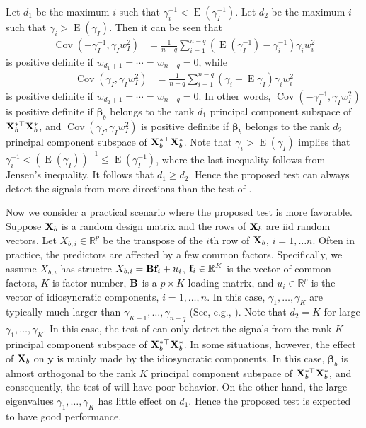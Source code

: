 \documentclass[11pt]{article}
\DeclareMathOperator{\myE}{E}
\DeclareMathOperator{\myCov}{Cov}
\newcommand{\By}{\mathbf{y}}    \newcommand{\Bz}{\mathbf{z}}
\newcommand{\bfsym}[1]{\ensuremath{\boldsymbol{#1}}}
\def\bbeta{\bfsym \beta}
\theoremstyle{plain}
\theoremstyle{definition}
\theoremstyle{remark}
\begin{document}
Let $d_1$ be the maximum $i$ such that $ \gamma_i^{-1} < \myE (\gamma_I^{-1})$.
Let $d_2$ be the maximum $i$ such that $\gamma_i > \myE (\gamma_I) $.
Then it can be seen that
\begin{align*}
\myCov (-\gamma_I^{-1}, \gamma_I w_I^2)
&=
\frac{1}{n-q} \sum_{i=1}^{n-q} \left(\myE (\gamma_I^{-1})-\gamma_i^{-1} \right) \gamma_i w_i^2
\end{align*}
is positive definite if $w_{d_1+1}=\cdots =w_{n-q}=0$, while
\begin{align*}
    \myCov(\gamma_I, \gamma_I w_I^2)
&=
\frac{1}{n-q} \sum_{i=1}^{n-q} \left(\gamma_i - \myE \gamma_I \right) \gamma_i w_i^2
\end{align*}
is positive definite if $w_{d_2 + 1}=\cdots = w_{n-q}=0$.
In other words, $\myCov(-\gamma_I^{-1}, \gamma_I w_I^2)$ is positive definite if $\bbeta_b$ belongs to the rank $d_1$ principal component subspace of $\mathbf{X}_{b}^{*\top}\mathbf{X}_b^{*}$, and $\myCov(\gamma_I, \gamma_I w_I^2)$ is positive definite if $\bbeta_b$ belongs to the rank $d_2$ principal component subspace of $\mathbf{X}_{b}^{*\top}\mathbf{X}_b^{*}$.
Note that $\gamma_i > \myE (\gamma_I)$ implies that $\gamma_i^{-1} < (\myE (\gamma_I))^{-1}\leq \myE (\gamma_I^{-1})$, where the last inequality follows from Jensen's inequality.
It follows that $ d_1 \geq d_2 $.
Hence the proposed test can always detect the signals from more directions than the test of \cite{Goeman2006}.

Now we consider a practical scenario where the proposed test is more favorable.
Suppose $\mathbf{X}_b$ is a random design matrix and the rows of $\mathbf{X}_b$ are iid random vectors.
Let $X_{b,i}\in \mathbb R^p$ be the transpose of the $i$th row of $\mathbf{X}_b$, $i=1,\ldots n$.
Often in practice, the predictors are affected by a few common factors.
Specifically, we assume $X_{b,i}$ has structre $X_{b,i}= \mathbf{B} \mathbf{f}_i + u_i$, $\mathbf{f}_i \in \mathbb R^K$ is the vector of common factors, $K$ is factor number, $\mathbf{B}$ is a $p\times K$ loading matrix, and $u_i\in \mathbb R^p$ is the vector of idiosyncratic components, $i=1,\ldots,n $.
In this case, $\gamma_1,\ldots, \gamma_K$ are typically much larger than $\gamma_{K+1},\ldots, \gamma_{n-q}$ (See, e.g., \cite{Fan2013Large}).
Note that $d_2=K$ for large $\gamma_1,\ldots, \gamma_K$.
In this case, the test of \cite{Goeman2006} can only detect the signals from the rank $K$ principal component subspace of $\mathbf{X}_b^{*\top} \mathbf{X}_b^*$.
In some situations, however, the effect of $\mathbf{X}_b$ on $\By$ is mainly made by the idiosyncratic components.
In this case, $\bbeta_b$ is almost orthogonal to the rank $K$ principal component subspace of $\mathbf{X}_b^{*\top} \mathbf{X}_b^*$, and consequently, the test of \cite{Goeman2006} will have poor behavior.
On the other hand, the large eigenvalues $\gamma_1,\ldots, \gamma_K$ has little effect on $d_1$.
Hence the proposed test is expected to have good performance.
\end{document}
